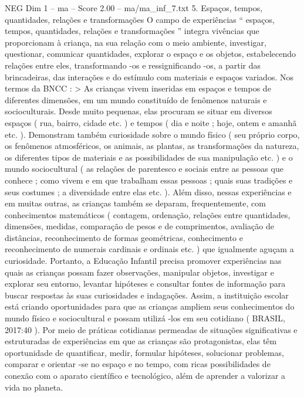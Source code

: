 \begin{textsample}{NEG Dim 1 – ma – Score 2.00 – ma/ma\_inf\_7.txt}  \label{ex:f1_neg_221}
5.
Espaços, tempos, quantidades, relações e transformações O campo de experiências “ espaços, tempos, quantidades, relações e transformações ” integra vivências que proporcionam à criança, na sua relação com o meio ambiente, investigar, questionar, comunicar quantidades, explorar o espaço e os objetos, estabelecendo relações entre eles, transformando -os e ressignificando -os, a partir das brincadeiras, das interações e do estímulo com materiais e espaços variados.
Nos termos da BNCC : > As crianças vivem inseridas em espaços e tempos de diferentes dimensões, em um mundo constituído de fenômenos naturais e socioculturais.
Desde muito pequenas, elas procuram se situar em diversos espaços ( rua, bairro, cidade etc. ) e tempos ( dia e noite ; hoje, ontem e amanhã etc. ).
Demonstram também curiosidade sobre o mundo físico ( seu próprio corpo, os fenômenos atmosféricos, os animais, as plantas, as transformações da natureza, os diferentes tipos de materiais e as possibilidades de sua manipulação etc. ) e o mundo sociocultural ( as relações de parentesco e sociais entre as pessoas que conhece ; como vivem e em que trabalham essas pessoas ; quais suas tradições e seus costumes ; a diversidade entre elas etc. ).
Além disso, nessas experiências e em muitas outras, as crianças também se deparam, frequentemente, com conhecimentos matemáticos ( contagem, ordenação, relações entre quantidades, dimensões, medidas, comparação de pesos e de comprimentos, avaliação de distâncias, reconhecimento de formas geométricas, conhecimento e reconhecimento de numerais cardinais e ordinais etc. ) que igualmente aguçam a curiosidade.
Portanto, a Educação Infantil precisa promover experiências nas quais as crianças possam fazer observações, manipular objetos, investigar e explorar seu entorno, levantar hipóteses e consultar fontes de informação para buscar respostas às suas curiosidades e indagações.
Assim, a instituição escolar está criando oportunidades para que as crianças ampliem seus conhecimentos do mundo físico e sociocultural e possam utilizá -los em seu cotidiano ( BRASIL, 2017:40 ).
Por meio de práticas cotidianas permeadas de situações significativas e estruturadas de experiências em que as crianças são protagonistas, elas têm oportunidade de quantificar, medir, formular hipóteses, solucionar problemas, comparar e orientar -se no espaço e no tempo, com ricas possibilidades de conexão com o aparato científico e tecnológico, além de aprender a valorizar a vida no planeta.

\end{textsample}
